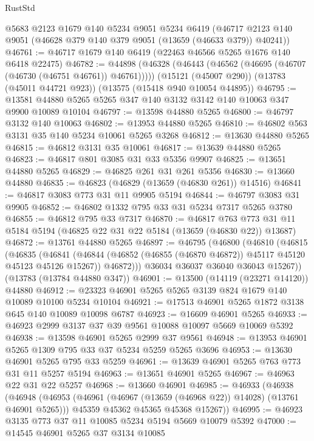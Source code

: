 \begin{lexlean}{RustStd}
\begin{coremodule}
    @5683
    @2123
    @1679
    @140
    @5234
    @9051
    @5234
    @6419
    (@46717 @2123 @140 @9051 (@46628 @379 @140 @379 @9051 (@13659 (@46633 @379)) @40241))
@46761 := @46717 @1679 @140 @6419 (@22463 @46566 @5265 @1676 @140 @6418 @22475)
@46782 := @44898
    (@46328 (@46443 (@46562 (@46695 (@46707 (@46730 (@46751 @46761)) @46761)))))
    (@15121 (@45007 @290))
    (@13783 (@45011 @44721 @923))
    (@13575 (@15418 @940 @10054 @44895))
@46795 := @13581 @44880 @5265 @5265 @347 @140 @3132 @3142 @140 @10063 @347 @9900 @10089 @10104
@46797 := @13598 @44880 @5265
@46800 := @46797 @3132 @140 @10063
@46802 := @13953 @44880 @5265
@46810 := @46802 @563 @3131 @35 @140 @5234 @10061 @5265 @3268
@46812 := @13630 @44880 @5265
@46815 := @46812 @3131 @35 @10061
@46817 := @13639 @44880 @5265
@46823 := @46817 @801 @3085 @31 @33 @5356 @9907
@46825 := @13651 @44880 @5265
@46829 := @46825 @261 @31 @261 @5356
@46830 := @13660 @44880
@46835 := @46823 (@46829 (@13659 (@46830 @261)) @14516)
@46841 := @46817 @3083 @773 @31 @11 @9905 @5194
@46844 := @46797 @3083 @31 @9905
@46852 := @46802 @1332 @795 @33 @31 @5234 @7317 @5265 @3780
@46855 := @46812 @795 @33 @7317
@46870 := @46817
    @763
    @773
    @31
    @11
    @5184
    @5194
    (@46825 @22 @31 @22 @5184 (@13659 (@46830 @22)) @13687)
@46872 := @13761 @44880 @5265
@46897 := @46795
    (@46800
      (@46810
        (@46815
          (@46835
            (@46841
              (@46844 (@46852 (@46855 (@46870 @46872)) @45117 @45120 @45123 @45126 @15267))
              @46872)))
        @36034
        @36037
        @36040
        @36043
        @15267))
    (@13783 (@13784 @44880 @347))
@46901 := @13500 (@14119 (@23271 @14120)) @44880
@46912 := @23323 @46901 @5265 @5265 @3139 @824 @1679 @140 @10089 @10100 @5234 @10104
@46921 := @17513 @46901 @5265 @1872 @3138 @645 @140 @10089 @10098 @6787
@46923 := @16609 @46901 @5265
@46933 := @46923 @2999 @3137 @37 @39 @9561 @10088 @10097 @5669 @10069 @5392
@46938 := @13598 @46901 @5265 @2999 @37 @9561
@46948 := @13953 @46901 @5265 @1309 @795 @33 @37 @5234 @5259 @5265 @3696
@46953 := @13630 @46901 @5265 @795 @33 @5259
@46961 := @13639 @46901 @5265 @763 @773 @31 @11 @5257 @5194
@46963 := @13651 @46901 @5265
@46967 := @46963 @22 @31 @22 @5257
@46968 := @13660 @46901
@46985 := @46933
    (@46938
      (@46948
        (@46953 (@46961 (@46967 (@13659 (@46968 @22)) @14028) (@13761 @46901 @5265)))
        @45359
        @45362
        @45365
        @45368
        @15267))
@46995 := @46923 @3135 @773 @37 @11 @10085 @5234 @5194 @5669 @10079 @5392
@47000 := @14545 @46901 @5265 @37 @3134 @10085

\end{coremodule}
\end{lexlean}
